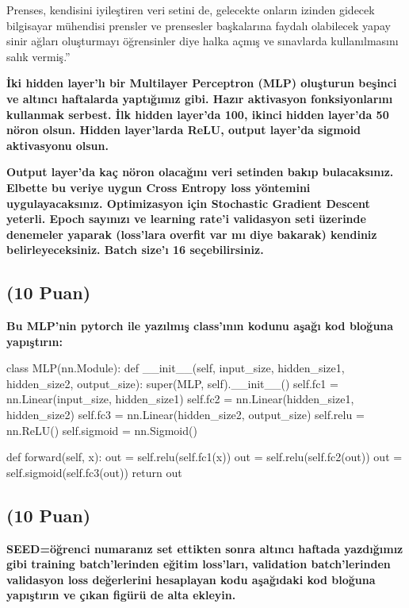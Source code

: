 \documentclass[11pt]{article}
\begin{document}
Prenses, kendisini iyileştiren veri setini de, gelecekte onların izinden gidecek bilgisayar mühendisi prensler ve prensesler başkalarına faydalı olabilecek yapay sinir ağları oluşturmayı öğrensinler diye halka açmış ve sınavlarda kullanılmasını salık vermiş.''

\textbf{İki hidden layer'lı bir Multilayer Perceptron (MLP) oluşturun beşinci ve altıncı haftalarda yaptığımız gibi. Hazır aktivasyon fonksiyonlarını kullanmak serbest. İlk hidden layer'da 100, ikinci hidden layer'da 50 nöron olsun. Hidden layer'larda ReLU, output layer'da sigmoid aktivasyonu olsun.}

\textbf{Output layer'da kaç nöron olacağını veri setinden bakıp bulacaksınız. Elbette bu veriye uygun Cross Entropy loss yöntemini uygulayacaksınız. Optimizasyon için Stochastic Gradient Descent yeterli. Epoch sayınızı ve learning rate'i validasyon seti üzerinde denemeler yaparak (loss'lara overfit var mı diye bakarak) kendiniz belirleyeceksiniz. Batch size'ı 16 seçebilirsiniz.}

\subsection{(10 Puan)} \textbf{Bu MLP'nin pytorch ile yazılmış class'ının kodunu aşağı kod bloğuna yapıştırın:}

\begin{python}
class MLP(nn.Module):
    def __init__(self, input_size, hidden_size1, hidden_size2, output_size):
        super(MLP, self).__init__()
        self.fc1 = nn.Linear(input_size, hidden_size1)
        self.fc2 = nn.Linear(hidden_size1, hidden_size2)
        self.fc3 = nn.Linear(hidden_size2, output_size)
        self.relu = nn.ReLU()
        self.sigmoid = nn.Sigmoid()

    def forward(self, x):
        out = self.relu(self.fc1(x))
        out = self.relu(self.fc2(out))
        out = self.sigmoid(self.fc3(out))
        return out
\end{python}

\subsection{(10 Puan)} \textbf{SEED=öğrenci numaranız set ettikten sonra altıncı haftada yazdığımız gibi training batch'lerinden eğitim loss'ları, validation batch'lerinden validasyon loss değerlerini hesaplayan kodu aşağıdaki kod bloğuna yapıştırın ve çıkan figürü de alta ekleyin.}
\end{document}

